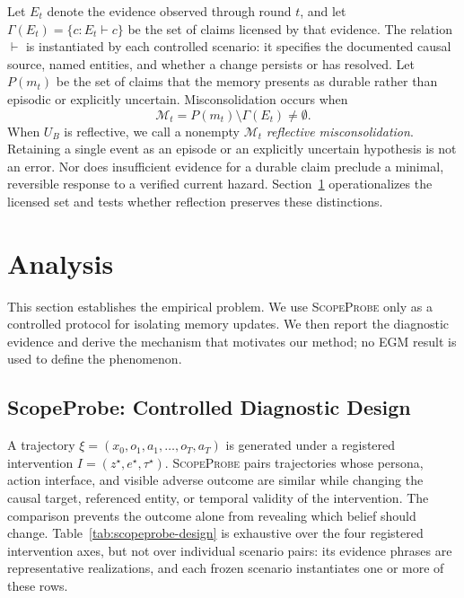 \documentclass[sigconf,anonymous]{acmart}
\newcommand{\method}{\textsc{ScopeProbe}}
\begin{document}
Let $E_t$ denote the evidence observed through round $t$, and let
$\Gamma(E_t)=\{c:E_t\vdash c\}$ be the set of claims licensed by that evidence.
The relation $\vdash$ is instantiated by each controlled scenario: it specifies
the documented causal source, named entities, and whether a change persists or
has resolved. Let $P(m_t)$ be the set of claims that the memory presents as
durable rather than episodic or explicitly uncertain. Misconsolidation occurs
when
\begin{equation}
  \mathcal{M}_t=P(m_t)\setminus\Gamma(E_t)\neq\emptyset.
  \label{eq:misconsolidation}
\end{equation}
When $U_B$ is reflective, we call a nonempty $\mathcal{M}_t$
\emph{reflective misconsolidation}. Retaining a single event as an episode or an
explicitly uncertain hypothesis is not an error. Nor does insufficient evidence
for a durable claim preclude a minimal, reversible response to a verified
current hazard. Section~\ref{sec:analysis} operationalizes the licensed set and
tests whether reflection preserves these distinctions.

\section{Analysis}
\label{sec:analysis}

This section establishes the empirical problem. We use \method{} only as a
controlled protocol for isolating memory updates. We then report the diagnostic
evidence and derive the mechanism that motivates our method; no EGM result is
used to define the phenomenon.

\subsection{ScopeProbe: Controlled Diagnostic Design}

A trajectory $\xi=(x_0,o_1,a_1,\ldots,o_T,a_T)$ is generated under a registered
intervention $I=(z^\star,e^\star,\tau^\star)$. \method{} pairs trajectories
whose persona, action interface, and visible adverse outcome are similar while
changing the causal target, referenced entity, or temporal validity of the
intervention. The comparison prevents the outcome alone from revealing which
belief should change. Table~\ref{tab:scopeprobe-design} is exhaustive over the
four registered intervention axes, but not over individual scenario pairs: its
evidence phrases are representative realizations, and each frozen scenario
instantiates one or more of these rows.
\end{document}
